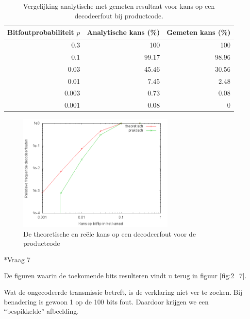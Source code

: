 \documentclass[]{article}
\begin{document}
\begin{section}
\begin{subsection}
        \begin{table}[h]
            \centering	
            \begin{tabular}{r|r|r}
                Bitfoutprobabiliteit $p$ &
                Analytische kans (\%) &
                Gemeten kans (\%)\\
                \hline
                0.3   & 100    & 100   \\
                0.1   &  99.17 & 98.96 \\
                0.03  &  45.46 & 30.56 \\
                0.01  &   7.45 & 2.48  \\
                0.003 &   0.73 & 0.08  \\
                0.001 &   0.08 & 0
            \end{tabular}
            \caption{Vergelijking analytische met gemeten resultaat
            voor kans op een decodeerfout bij productcode.}
            \label{tab:2_6}
        \end{table}    
        \begin{figure}
            \centering
            \includegraphics[width=0.7\textwidth]{vraag2_6.png}
            \caption{De theoretische en re\"ele kans op een
            decodeerfout voor de productcode}
            \label{fig:2_6}
        \end{figure}
    \end{subsection}
	
    \begin{subsection}*{Vraag 7} %

        De figuren waarin de toekomende bits resulteren vindt u terug
        in figuur \ref{fig:2_7}.

        Wat de ongecodeerde transmissie betreft, is de verklaring niet
        ver te zoeken. Bij benadering is gewoon 1 op de 100 bits fout.
        Daardoor krijgen we een ``bespikkelde'' afbeelding.


\end{subsection}
\end{section}
\end{document}
